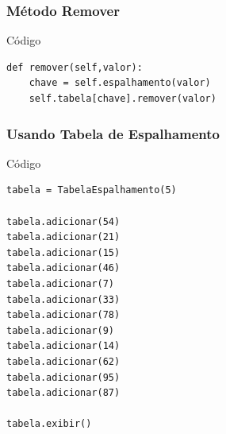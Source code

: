 \documentclass{beamer}
\begin{document}
\begin{frame}[fragile]
\frametitle{Método Remover}

\begin{exampleblock}{Código}
	\begin{lstlisting}
def remover(self,valor):
    chave = self.espalhamento(valor)
    self.tabela[chave].remover(valor)
	\end{lstlisting}
\end{exampleblock}
\end{frame}

\begin{frame}[fragile]
\frametitle{Usando Tabela de Espalhamento}

\begin{exampleblock}{Código}
	\begin{lstlisting}
tabela = TabelaEspalhamento(5)

tabela.adicionar(54)
tabela.adicionar(21)
tabela.adicionar(15)
tabela.adicionar(46)
tabela.adicionar(7)
tabela.adicionar(33)
tabela.adicionar(78)
tabela.adicionar(9)
tabela.adicionar(14)
tabela.adicionar(62)
tabela.adicionar(95)
tabela.adicionar(87)

tabela.exibir()
	\end{lstlisting}
\end{exampleblock}
\end{frame}
\end{document}
